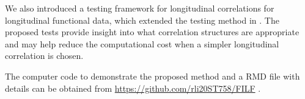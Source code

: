 \documentclass[submit]{smj}
\begin{document}
We also introduced a testing framework for longitudinal correlations for longitudinal functional data, which extended the testing method in \cite{Chen2019}. The proposed tests provide insight into what correlation structures are appropriate and may help reduce the computational cost  when a simpler longitudinal correlation is chosen.

The computer code to demonstrate the proposed method and a RMD file with details can be obtained from \url{https://github.com/rli20ST758/FILF} .




\end{document}

